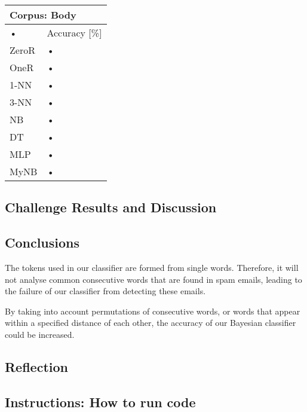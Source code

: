 \documentclass[10pt, a4paper]{article}
\begin{document}
\begin{tabular}{|l|l|}
\hline
\multicolumn{2}{|l|}{Corpus: Body} \\
\hline
• & Accuracy [\%] \\
\hline
ZeroR & • \\
\hline
OneR & • \\
\hline
1-NN & • \\
\hline
3-NN & • \\
\hline
NB & • \\
\hline
DT & • \\
\hline
MLP & • \\
\hline
MyNB & • \\
\hline
\end{tabular}


\subsection*{Challenge Results and Discussion}

\subsection*{Conclusions}

The tokens used in our classifier are formed from single words. Therefore, it will not analyse common consecutive words that are found in spam emails, leading to the failure of our classifier from detecting these emails.

By taking into account permutations of consecutive words, or words that appear within a specified distance of each other, the accuracy of our Bayesian classifier could be increased.

\subsection*{Reflection}

\subsection*{Instructions: How to run code}
\end{document}

